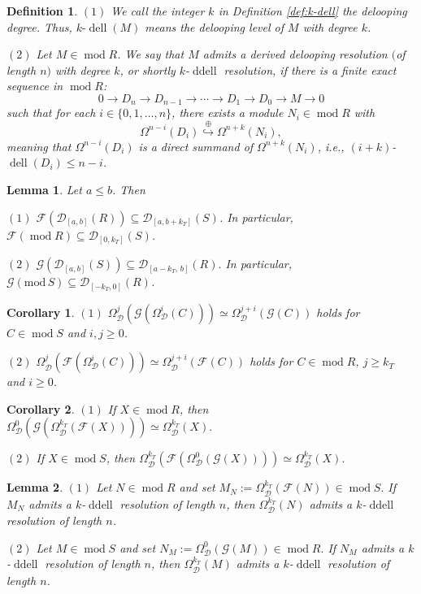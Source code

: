 \documentclass[10pt,a4paper]{amsart}
\newtheorem{definition}{Definition}
\newtheorem{lemma}{Lemma}
\newtheorem{corollary}{Corollary}
\newcommand{\D}{\mathcal{D}}
\DeclareMathOperator{\ddell}{ddell}
\DeclareMathOperator{\dell}{dell}
\DeclareMathOperator{\modd}{mod}
\newcommand{\oemb}{\stackrel{\oplus}{\hookrightarrow}}
\newcommand{\syz}{\Omega_{\mathcal{D}}}
\begin{document}
\begin{definition}\label{def:classical-ddell}
$(1)$ We call the integer $k$ in Definition \ref{def:k-dell} the \emph{delooping degree}. Thus, $k\text{-}\dell(M)$ means the delooping level of $M$ with degree $k$.
 
$(2)$ Let $M \in \modd R$. We say that $M$ admits a \emph{derived delooping resolution $($of length $n$$)$ with degree $k$}, or shortly \emph{$k$-$\ddell$ resolution}, if there is a finite exact sequence in $\modd R$:
\[
0 \longrightarrow D_n \longrightarrow D_{n-1} \longrightarrow \cdots \longrightarrow D_1 \longrightarrow D_0 \longrightarrow M \longrightarrow 0
\]
such that for each $i \in \{0, 1, \ldots, n\}$, there exists a module $N_i \in \modd R$ with
\[
\Omega^{n-i}(D_i) \oemb \Omega^{n+k}(N_i),
\]
meaning that $\Omega^{n-i}(D_i)$ is a direct summand of $\Omega^{n+k}(N_i)$, i.e., $(i+k)$-$\dell(D_i)\le n-i$.
\end{definition}

\begin{lemma}\label{lem:image-bounded}
Let $a \leq b$. Then 

$(1)$ $ \mathcal{F}(\D_{[a,b]}(R)) \subseteq \D_{[a,b+k_T]}(S)$.
In particular, $\mathcal{F}(\modd R) \subseteq \D_{[0,k_T]}(S)$.

$(2)$ \(
\mathcal G(\D_{[a,b]}(S)) \subseteq \D_{[a-k_T,\, b]}(R).
\)
In particular, \(\mathcal G(\mathrm{mod}\,S)\subseteq \D_{[-k_T,0]}(R)\).
\end{lemma}

\begin{corollary} \label{cor:iterative-syzygy}
$(1)$
\(
\syz^j(\mathcal{G}(\syz^i(C))) \simeq \syz^{j+i}(\mathcal{G}(C)) 
\) holds for $C \in \modd S$ and $i,j \geq 0$.

$(2)$ 
\(
\syz^j(\mathcal{F}(\syz^i(C))) \simeq \syz^{j+i}(\mathcal{F}(C))
\) holds for $C \in \modd R$, $j \geq k_T$ and $i\ge 0$.
\end{corollary}

\begin{corollary}\label{cor:key-syzygy}
$(1)$ If $X \in \modd R$, then
\(
\syz^{0}(\mathcal{G}(\syz^{k_T}(\mathcal{F}(X)))) \simeq \syz^{k_T}(X).
\)

$(2)$ If $X \in \modd S$, then
\(
\syz^{k_T}(\mathcal{F}(\syz^{0}(\mathcal{G}(X)))) \simeq \syz^{k_T}(X).
\)
\end{corollary}

\begin{lemma} \label{lem:transfer}
$(1)$ Let \(N\in\modd R\) and set $
M_N:=\syz^{k_T}(\mathcal{F}(N))\in\modd S.
$
If \(M_N\) admits a \(k\)-\(\ddell\) resolution of length \(n\), then \(\syz^{k_T}(N)\) admits a \(k\)-\(\ddell\) resolution of length \(n\).

$(2)$ Let \(M\in\modd S\) and set $
N_M:=\syz^{0}(\mathcal{G}(M))\in\modd R.
$
If \(N_M\) admits a \(k\)-\(\ddell\) resolution of length \(n\), then \(\syz^{k_T}(M)\) admits a \(k\)-\(\ddell\) resolution of length \(n\).
\end{lemma}
\end{document}
